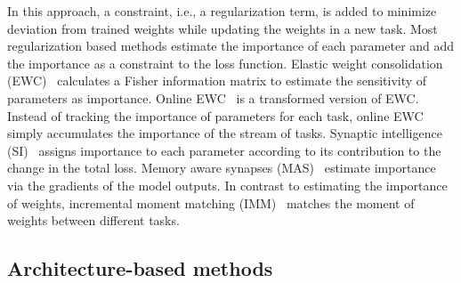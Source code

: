 \documentclass{article} %
\begin{document}
In this approach, a constraint, i.e., a regularization term, is added to minimize deviation from trained weights while updating the weights in a new task.
Most regularization based methods estimate the importance of each parameter and add the importance as a constraint to the loss function.
Elastic weight consolidation (EWC)~\citep{kirkpatrick2017overcoming} calculates a Fisher information matrix to estimate the sensitivity of parameters as importance.
Online EWC~\citep{schwarz2018progress} is a transformed version of EWC.
Instead of tracking the importance of parameters for each task, online EWC simply accumulates the importance of the stream of tasks.
Synaptic intelligence (SI)~\citep{zenke2017continual} assigns importance to each parameter according to its contribution to the change in the total loss.
Memory aware synapses (MAS)~\citep{aljundi2018memory} estimate importance via the gradients of the model outputs. 
In contrast to estimating the importance of weights, incremental moment matching (IMM)~\citep{lee2017overcoming} matches the moment of weights between different tasks.


\subsection{Architecture-based methods}
\end{document}
